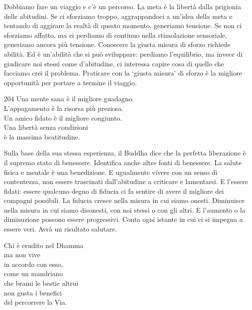 \begin{dhpRefl}
Dobbiamo fare un viaggio e c'\`{e} un percorso. La meta \`{e} la libert\`{a} dalla prigionia delle abitudini. Se ci sforziamo troppo, aggrappandoci a un'idea della meta e tentando di aggirare la realt\`{a} di questo momento, generiamo tensione. Se non ci sforziamo affatto, ma ci perdiamo di continuo nella stimolazione sensoriale, generiamo ancora più tensione. Conoscere la giusta misura di sforzo richiede abilit\`{a}. Ed \`{e} un'abilit\`{a} che si pu\`{o} sviluppare: perdiamo l'equilibrio, ma invece di giudicare noi stessi come d'abitudine, ci interessa capire cosa di quello che facciamo crei il problema. Praticare con la `giusta misura' di sforzo \`{e} la migliore opportunit\`{a} per portare a termine il viaggio.
\end{dhpRefl}


\begin{dhpVerse}{204}
\label{dhp-204}
Una mente sana \`{e} il migliore guadagno.\\
L'appagamento \`{e} la risorsa più preziosa.\\
Un amico fidato \`{e} il migliore congiunto.\\
Una libert\`{a} senza condizioni\\
\`{e} la massima beatitudine.
\end{dhpVerse}

\begin{dhpRefl}
Sulla base della sua stessa esperienza, il Buddha dice che la perfetta liberazione \`{e} il supremo stato di benessere. Identifica anche altre fonti di benessere. La salute fisica e mentale \`{e} una benedizione. E ugualmente vivere con un senso di contentezza, non essere trascinati dall'abitudine a criticare e lamentarsi. E l'essere fidati: essere qualcuno degno di fiducia ci fa sentire di avere il migliore dei compagni possibili. La fiducia cresce nella misura in cui siamo onesti. Diminuisce nella misura in cui siamo disonesti, con noi stessi o con gli altri. E l'aumento o la diminuzione possono essere progressivi. Conta ogni istante in cui ci si impegna a essere veri. Avr\`{a} un risultato salutare.
\end{dhpRefl}


\begin{dhpVerse}{19}
\label{dhp-19}
Chi \`{e} erudito nel Dhamma\\
ma non vive\\
in accordo con esso,\\
come un mandriano\\
che brami le bestie altrui\\
non gusta i benefici\\
del percorrere la Via.
\end{dhpVerse}


